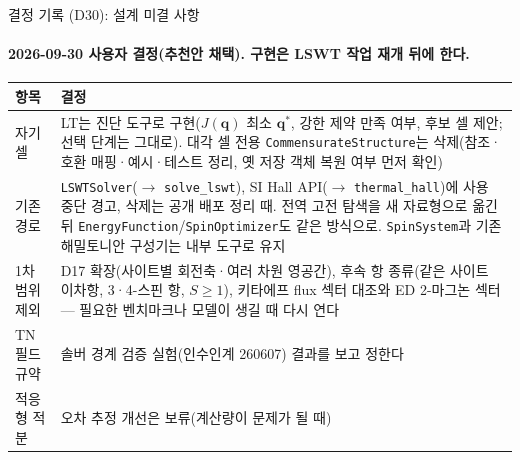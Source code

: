 \begin{frame}[label=decisions-d30]{결정 기록 (D30): 설계 미결 사항}
  \framesubtitle{2026-09-30 사용자 결정(추천안 채택). 구현은 LSWT 작업 재개 뒤에 한다.}
  \footnotesize\renewcommand{\arraystretch}{1.1}
  \begin{tabularx}{\textwidth}{@{}p{2.4cm}Y@{}}
    \toprule
    항목 & 결정 \\
    \midrule
    자기 셀 & LT는 진단 도구로 구현($J(\mathbf q)$ 최소 $\mathbf q^*$, 강한 제약 만족 여부, 후보 셀 제안; 선택 단계는 그대로). 대각 셀 전용 \texttt{CommensurateStructure}는 삭제(참조·호환 매핑·예시·테스트 정리, 옛 저장 객체 복원 여부 먼저 확인) \\
    기존 경로 & \texttt{LSWTSolver}($\to$ \texttt{solve\_lswt}), SI Hall API($\to$ \texttt{thermal\_hall})에 사용 중단 경고, 삭제는 공개 배포 정리 때. 전역 고전 탐색을 새 자료형으로 옮긴 뒤 \texttt{EnergyFunction}/\texttt{SpinOptimizer}도 같은 방식으로. \texttt{SpinSystem}과 기존 해밀토니안 구성기는 내부 도구로 유지 \\
    1차 범위 제외 & D17 확장(사이트별 회전축·여러 차원 영공간), 후속 항 종류(같은 사이트 이차항, 3·4-스핀 항, $S\ge1$), 키타에프 flux 섹터 대조와 ED 2-마그논 섹터 --- 필요한 벤치마크나 모델이 생길 때 다시 연다 \\
    TN 필드 규약 & 솔버 경계 검증 실험(인수인계 260607) 결과를 보고 정한다 \\
    적응형 적분 & 오차 추정 개선은 보류(계산량이 문제가 될 때) \\
    \bottomrule
  \end{tabularx}
\end{frame}

